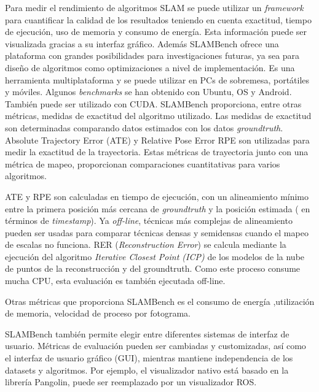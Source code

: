 \begin {enumerate}
Para medir el rendimiento de algoritmos SLAM se puede utilizar un \textit{framework} para cuantificar la calidad de los resultados teniendo en cuenta exactitud, tiempo de ejecución, uso de memoria y consumo de energía. Esta información puede ser visualizada gracias a su interfaz gráfico.
Además SLAMBench ofrece una plataforma con grandes posibilidades para investigaciones futuras, ya sea para diseño de algoritmos como optimizaciones a nivel de implementación. Es una herramienta multiplataforma y se puede utilizar en PCs de sobremesa, portátiles y móviles. Algunos \textit{benchmarks} se han obtenido con Ubuntu, OS y Android.
También puede ser utilizado con CUDA.
SLAMBench proporciona, entre otras métricas, medidas de exactitud del algoritmo utilizado. Las medidas de exactitud son determinadas comparando datos estimados con los datos \textit{groundtruth}.
Absolute Trajectory Error (ATE) y Relative Pose Error RPE son utilizadas para medir la exactitud de la trayectoria. Estas métricas de trayectoria junto con una métrica de mapeo, proporcionan comparaciones cuantitativas para varios algoritmos.

ATE y RPE son calculadas en tiempo de ejecución, con un alineamiento mínimo entre la primera posición más cercana de \textit{groundtruth} y la posición estimada ( en términos de \textit{timestamp}). Ya \textit{off-line}, técnicas más complejas de alineamiento pueden ser usadas para comparar técnicas densas y semidensas cuando el mapeo de escalas no funciona. RER (\textit{Reconstruction Error}) se calcula mediante la ejecución del algoritmo \textit{Iterative Closest Point (ICP)} de los modelos de la nube de puntos de la reconstrucción y del groundtruth. Como este proceso consume mucha CPU, esta evaluación es también ejecutada off-line.

Otras métricas que proporciona SLAMBench es el consumo de energía ,utilización de memoria, velocidad de proceso por fotograma.

SLAMBench también permite elegir entre diferentes sistemas de interfaz de usuario. Métricas de evaluación pueden ser cambiadas y customizadas, así como el interfaz de usuario gráfico (GUI), mientras mantiene independencia de los datasets y algoritmos. Por ejemplo, el visualizador nativo está basado en la librería Pangolin, puede ser reemplazado por un visualizador ROS.


\end{enumerate}
